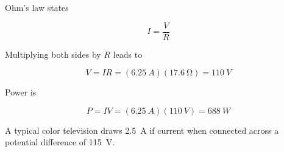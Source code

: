 \documentclass[answers]{exam}
\begin{document}
\begin{questions}
\begin{solution}
Ohm's law states

\begin{equation*}
    I = \frac{V}{R}
\end{equation*}

Multiplying both sides by $R$ leads to

\begin{equation*}
    V = IR = (\SI{6.25}{A})(\SI{17.6}{\ohm}) = \SI{110}{V}
\end{equation*}

Power is

\begin{equation*}
    P = IV = (\SI{6.25}{A})(\SI{110}{V}) = \boxed{\SI{688}{W}}
\end{equation*}
\end{solution}

\question
A typical color television draws \SI{2.5}{A} if current when connected across a potential difference of \SI{115}{V}. 

\end{questions}
\end{document}

